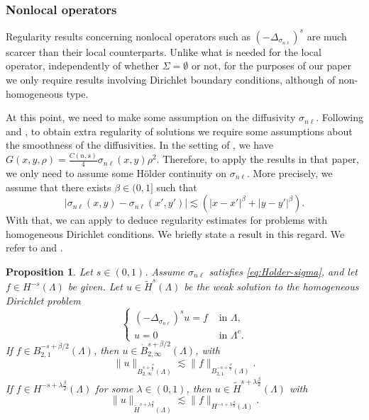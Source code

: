 \documentclass{amsart}
\newcommand{\domain}{\Lambda}
\newcommand{\snl}{{\sigma_{n\ell}}}
\theoremstyle{plain}
\newtheorem{proposition}{Proposition}
\numberwithin{equation}{section}
\numberwithin{table}{section}
\numberwithin{figure}{section}
\numberwithin{theorem}{section}
\numberwithin{corollary}{section}
\numberwithin{definition}{section}
\numberwithin{lemma}{section}
\numberwithin{proposition}{section}
\numberwithin{remark}{section}
\begin{document}
\subsubsection{Nonlocal operators}
Regularity results concerning nonlocal operators such as $(-\Delta_\snl)^s$ are much scarcer than their local counterparts. Unlike what is needed for the local operator, independently of whether $\Sigma = \emptyset$ or not, for the purposes of our paper we only require results involving Dirichlet boundary conditions, although of non-homogeneous type. 

At this point, we need to make some assumption on the diffusivity $\snl$. Following \cite[E1]{Savare98} and \cite[Hypothesis 2.11]{BoLiNo23}, to obtain extra regularity of solutions we require some assumptions about the smoothness of the diffusivities. In the setting of \cite{BoLiNo23}, we have $G(x,y,\rho) = \frac{C(n,s)}4 \snl(x,y) \rho^2$. Therefore, to apply the results in that paper, we only need to assume some H\"older continuity on $\snl$. More precisely, we assume that there exists $\beta \in (0,1]$ such that
\begin{equation} \label{eq:Holder-sigma}
| \snl(x,y) - \snl(x',y') | \lesssim \left(|x-x'|^\beta + |y-y'|^\beta \right).
\end{equation}
With that, we can apply \cite[Theorem 3.4]{BoLiNo23} to deduce regularity estimates for problems with homogeneous Dirichlet conditions. We briefly state a result in this regard. We refer to \cite[Corollary 1.1]{BoNo23} and \cite[Corollary 3.8]{BoLiNo23}.

\begin{proposition}
Let $s \in (0,1)$. Assume $\snl$ satisfies \eqref{eq:Holder-sigma}, and let $f\in H^{-s}(\domain)$ be given. Let $u \in \widetilde H^s(\domain)$ be the weak solution to the homogeneous Dirichlet problem
\begin{equation} \label{eq:Dirichlet-FL}
 \left\lbrace \begin{aligned}
(-\Delta_\snl)^s  u = f  & \mbox{ in } \domain, \\
u = 0 & \mbox{ in } \domain^c.
\end{aligned} \right.
\end{equation}
If $f\in B^{-s+\beta/2}_{2,1}(\domain)$, then $u \in \dot B^{s+\beta/2}_{2,\infty}(\domain)$, with 
\begin{equation}\label{eq:bes-regularity-max}
  \| u \|_{\dot{B}^{s+ \frac\beta{2}}_{2,\infty}(\domain)} \lesssim  \| f \|_{B^{-s+\frac\beta{2}}_{2,1}(\domain)}.
\end{equation}
If $f\in H^{-s+\lambda \frac\beta{2}}(\domain)$ for some $\lambda \in (0,1)$, then $u \in \widetilde{H}^{s+ \lambda \frac\beta{2}}(\domain)$ with
\begin{equation}\label{eq:sob-regularity-intermediate}
  \| u \|_{\widetilde{H}^{s+ \lambda \frac\beta{2}}(\domain)} \lesssim  \| f \|_{H^{-s+\lambda \frac\beta{2}}(\domain)}.
\end{equation}
\end{proposition}
\end{document}
